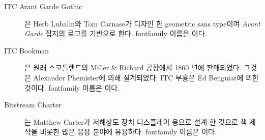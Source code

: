 \begin{description}

\item[ITC Avant Garde Gothic] { 은 Herb Lubalin와 
Tom Carnase가 디자인 한 geometric sans type이며 \textit{Avant Garde} 잡지의 로고를 기반으로 한다. fontfamily 이름은  이다.

\vspace{0.5\onelineskip}
\fox\par\Kafka\par\namesAZ
\vspace{0.5\onelineskip}
}


\item[ITC Bookman] { 은 원래 스코틀랜드의  Miller \&  Richard 공장에서 1860 년에 판매되었다. 
그것은 Alexander Phemister에 의해 설계되었다. ITC 부흥은 Ed Benguiat에 의한 것이다. fontfamily 이름은  이다.


\vspace{0.5\onelineskip}
\fox\par\Kafka\par\namesAZ
\vspace{0.5\onelineskip}
}


\item[Bitstream Charter] { 는 Matthew Carter가 저해상도 장치 디스플레이 용으로 설계 한 것으로 
책 제작을 비롯한 많은 응용 분야에 유용하다. fontfamily 이름은 이다.

}
\end{description}
